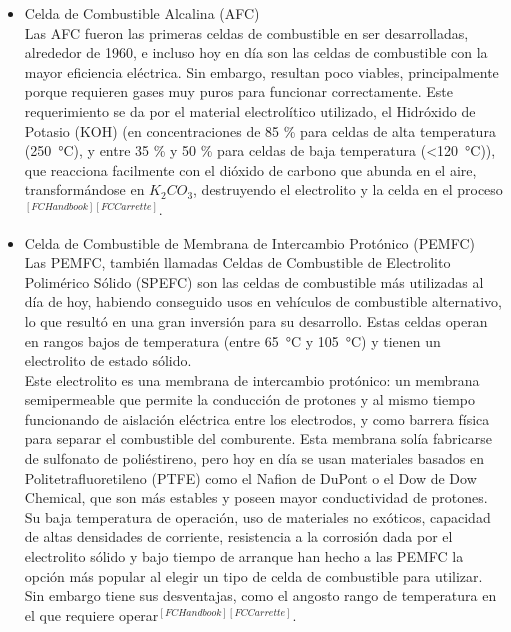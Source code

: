 \begin{itemize}
    \item {\SemiBold Celda de Combustible Alcalina (AFC)}\\

    Las AFC fueron las primeras celdas de combustible en ser desarrolladas, alrededor de 1960, e incluso hoy en día son las celdas de combustible con la mayor eficiencia eléctrica. Sin embargo, resultan poco viables, principalmente porque requieren gases muy puros para funcionar correctamente. Este requerimiento se da por el material electrolítico utilizado, el Hidróxido de Potasio (KOH) (en concentraciones de 85 \% para celdas de alta temperatura (\SI{250}{\celsius}), y entre 35 \% y 50 \% para celdas de baja temperatura (<\SI{120}{\celsius})), que reacciona facilmente con el dióxido de carbono que abunda en el aire, transformándose en $K_2CO_3$, destruyendo el electrolito y la celda en el proceso$^{[FCHandbook][FCCarrette]}$.\\

    \item {\SemiBold Celda de Combustible de Membrana de Intercambio Protónico (PEMFC)}\\

    Las PEMFC, también llamadas Celdas de Combustible de Electrolito Polimérico Sólido (SPEFC) son las celdas de combustible más utilizadas al día de hoy, habiendo conseguido usos en vehículos de combustible alternativo, lo que resultó en una gran inversión para su desarrollo. Estas celdas operan en rangos bajos de temperatura (entre \SI{65}{\celsius} y \SI{105}{\celsius}) y tienen un electrolito de estado sólido.\\
    
    Este electrolito es una membrana de intercambio protónico: un membrana semipermeable que permite la conducción de protones y al mismo tiempo funcionando de aislación eléctrica entre los electrodos, y como barrera física para separar el combustible del comburente. Esta membrana solía fabricarse de sulfonato de poliéstireno, pero hoy en día se usan materiales basados en Politetrafluoretileno (PTFE) como el Nafion de DuPont o el Dow de Dow Chemical, que son más estables y poseen mayor conductividad de protones.\\

    Su baja temperatura de operación, uso de materiales no exóticos, capacidad de altas densidades de corriente, resistencia a la corrosión dada por el electrolito sólido y bajo tiempo de arranque han hecho a las PEMFC la opción más popular al elegir un tipo de celda de combustible para utilizar. Sin embargo tiene sus desventajas, como el angosto rango de temperatura en el que requiere operar$^{[FCHandbook][FCCarrette]}$.\\


\end{itemize}
